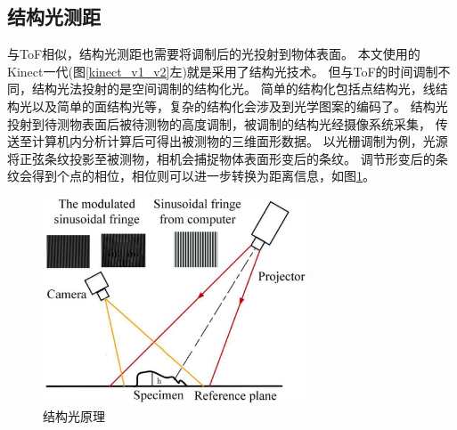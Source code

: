 \subsection{结构光测距}
与ToF相似，结构光测距也需要将调制后的光投射到物体表面。
本文使用的Kinect一代(图\ref{kinect_v1_v2}左)就是采用了结构光技术。
但与ToF的时间调制不同，结构光法投射的是空间调制的结构化光。
简单的结构化包括点结构光，线结构光以及简单的面结构光等，复杂的结构化会涉及到光学图案的编码了。
结构光投射到待测物表面后被待测物的高度调制，被调制的结构光经摄像系统采集，
传送至计算机内分析计算后可得出被测物的三维面形数据。
以光栅调制为例，光源将正弦条纹投影至被测物，相机会捕捉物体表面形变后的条纹。
调节形变后的条纹会得到个点的相位，相位则可以进一步转换为距离信息，如图\ref{str_lighting}。
\begin{figure}[h]
    \centering
    \includegraphics[width = 0.7\textwidth]{./Pictures/str_lighting.eps}
    \caption{结构光原理}
    \label{str_lighting}
\end{figure}
